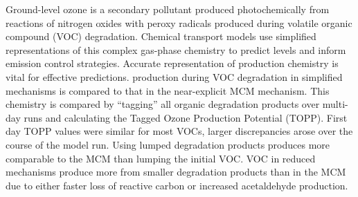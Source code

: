 Ground-level ozone is a secondary pollutant produced photochemically from reactions of nitrogen oxides with peroxy radicals produced during volatile organic compound (VOC) degradation. 
Chemical transport models use simplified representations of this complex gas-phase chemistry to predict  levels and inform emission control strategies. 
Accurate representation of  production chemistry is vital for effective predictions.
 production during VOC degradation in simplified mechanisms is compared to that in the near-explicit MCM mechanism. 
This chemistry is compared by ``tagging'' all organic degradation products over multi-day runs and calculating the Tagged Ozone Production Potential (TOPP). 
First day TOPP values were similar for most VOCs, larger discrepancies arose over the course of the model run. 
Using lumped degradation products produces more comparable  to the MCM than lumping the initial VOC.
VOC in reduced mechanisms produce more  from smaller degradation products than in the MCM due to either faster loss of reactive carbon or increased acetaldehyde production.
